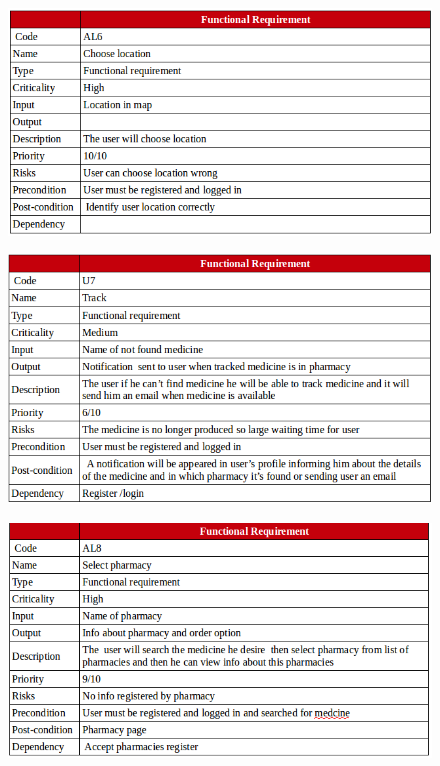 \documentclass[]{article}
\begin{document}
\begin{figure}[H]
\centering
\includegraphics[scale=0.4]{./f/06}
\end{figure}

\begin{figure}[H]
\centering
\includegraphics[scale=0.4]{./f/07}
\end{figure}

\begin{figure}[H]
\centering
\includegraphics[scale=0.4]{./f/08}
\end{figure}
\end{document}
